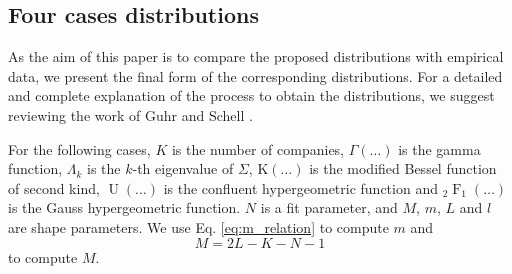 \subsection{Four cases distributions}\label{subsec:distributions}

As the aim of this paper is to compare the proposed distributions with
empirical data, we present the final form of the corresponding distributions.
For a detailed and complete explanation of the process to obtain the
distributions, we suggest reviewing the work of Guhr and Schell
\cite{exact_distributions_guhr}.

For the following cases, $K$ is the number of companies,
$\Gamma\left(\ldots\right)$ is the gamma function, $\Lambda_{k}$ is the $k$-th
eigenvalue of $\Sigma$, $\operatorname{K\left(\ldots\right)}$ is the modified
Bessel function of second kind, $\operatorname{U}\left(\ldots\right)$ is the
confluent hypergeometric function and
$_{2}\operatorname{F}_{1}\left(\ldots\right)$ is the Gauss hypergeometric
function. $N$ is a fit parameter, and $M$, $m$, $L$ and $l$ are shape
parameters. We use Eq. \ref{eq:m_relation} to compute $m$ and
\begin{equation}
    M = 2L - K - N - 1
\end{equation}
to compute $M$.

